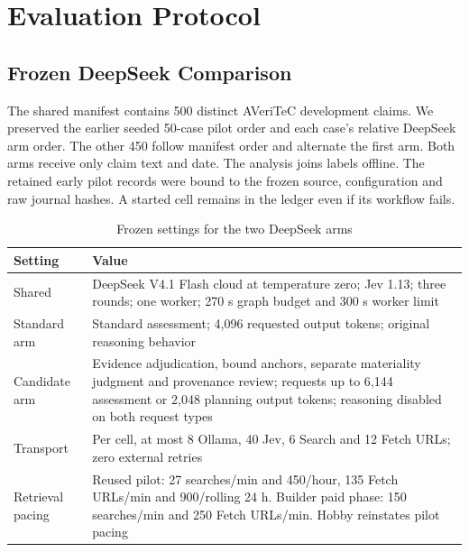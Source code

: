 \documentclass[conference]{IEEEtran}
\begin{document}
\section{Evaluation Protocol}
\subsection{Frozen DeepSeek Comparison}
The shared manifest contains 500 distinct AVeriTeC development claims. We preserved the earlier seeded 50-case pilot order and each case's relative DeepSeek arm order. The other 450 follow manifest order and alternate the first arm. Both arms receive only claim text and date. The analysis joins labels offline. The retained early pilot records were bound to the frozen source, configuration and raw journal hashes. A started cell remains in the ledger even if its workflow fails.

\begin{table}[t]
\caption{Frozen settings for the two DeepSeek arms}
\label{tab:deepseek-settings}
\centering
\footnotesize
\begin{tabular}{@{}p{}p{}@{}}
\toprule
Setting & Value\\
\midrule
Shared & DeepSeek V4.1 Flash cloud at temperature zero; Jev 1.13; three rounds; one worker; 270 s graph budget and 300 s worker limit\\
Standard arm & Standard assessment; 4,096 requested output tokens; original reasoning behavior\\
Candidate arm & Evidence adjudication, bound anchors, separate materiality judgment and provenance review; requests up to 6,144 assessment or 2,048 planning output tokens; reasoning disabled on both request types\\
Transport & Per cell, at most 8 Ollama, 40 Jev, 6 Search and 12 Fetch URLs; zero external retries\\
Retrieval pacing & Reused pilot: 27 searches/min and 450/hour, 135 Fetch URLs/min and 900/rolling 24 h. Builder paid phase: 150 searches/min and 250 Fetch URLs/min. Hobby reinstates pilot pacing\\
\bottomrule
\end{tabular}
\end{table}
\end{document}
